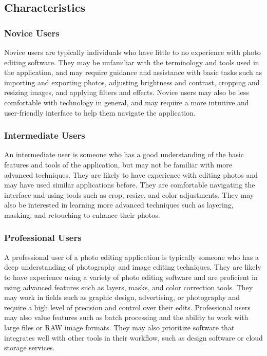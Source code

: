 \documentclass[11pt,a4paper]{article}
\begin{document}
\subsection*{Characteristics}

\subsubsection*{Novice Users}

Novice users are typically individuals who have little to no experience with
photo editing software. They may be unfamiliar with the terminology and tools
used in the application, and may require guidance and assistance with basic
tasks such as importing and exporting photos, adjusting brightness and contrast,
cropping and resizing images, and applying filters and effects. Novice users may
also be less comfortable with technology in general, and may require a more
intuitive and user-friendly interface to help them navigate the application.


\subsubsection*{Intermediate Users}

An intermediate user is someone who has a good understanding of the basic
features and tools of the application, but may not be familiar with more
advanced techniques. They are likely to have experience with editing photos and
may have used similar applications before. They are comfortable navigating the
interface and using tools such as crop, resize, and color adjustments. They may
also be interested in learning more advanced techniques such as layering,
masking, and retouching to enhance their photos. 

\subsubsection*{Professional Users}

A professional user of a photo editing application is typically someone who has
a deep understanding of photography and image editing techniques. They are
likely to have experience using a variety of photo editing software and are
proficient in using advanced features such as layers, masks, and color
correction tools. They may work in fields such as graphic design, advertising,
or photography and require a high level of precision and control over their
edits. Professional users may also value features such as batch processing and
the ability to work with large files or RAW image formats. They may also
prioritize software that integrates well with other tools in their workflow,
such as design software or cloud storage services.
\end{document}
